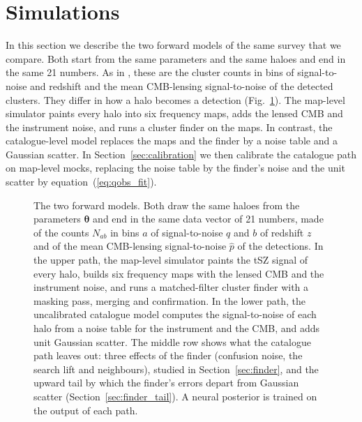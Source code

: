 \section{Simulations}\label{sec:sims}

In this section we describe the two forward models of the same survey that we compare. Both start from the same parameters and the same haloes and end in the same 21 numbers. As in
\citet{Zubeldia2025}, these are the cluster counts in bins of signal-to-noise and redshift and the mean
CMB-lensing signal-to-noise of the detected clusters. They differ in how a halo becomes a detection
(Fig.~\ref{fig:pipeline}). The map-level simulator paints every halo into six frequency maps, adds the
lensed CMB and the instrument noise, and runs a cluster finder on the maps. In contrast, the
catalogue-level model replaces the maps and the finder by a noise table and a Gaussian scatter. In
Section~\ref{sec:calibration} we then calibrate the catalogue path on map-level mocks, replacing the noise
table by the finder's noise and the unit scatter by equation~(\ref{eq:qobs_fit}).

\begin{figure}
\centering

\caption{The two forward models. Both draw the same haloes from the parameters $\bm\theta$ and end in the
same data vector of 21 numbers, made of the counts $N_{ab}$ in bins $a$ of signal-to-noise $q$ and $b$ of
redshift $z$ and of the mean CMB-lensing signal-to-noise $\hat p$ of the detections. In the upper path,
the map-level simulator paints the tSZ signal of every halo, builds six frequency maps with the lensed CMB
and the instrument noise, and runs a matched-filter cluster finder with a masking pass, merging and
confirmation. In the lower path, the uncalibrated catalogue model computes the signal-to-noise of each halo
from a noise table for the instrument and the CMB, and adds unit Gaussian scatter. The middle row shows
what the catalogue path leaves out: three effects of the finder (confusion noise, the search lift and
neighbours), studied in Section~\ref{sec:finder}, and the upward tail by which the finder's errors depart
from Gaussian scatter (Section~\ref{sec:finder_tail}). A neural posterior is trained on the output of each
path.}
\label{fig:pipeline}
\end{figure}


